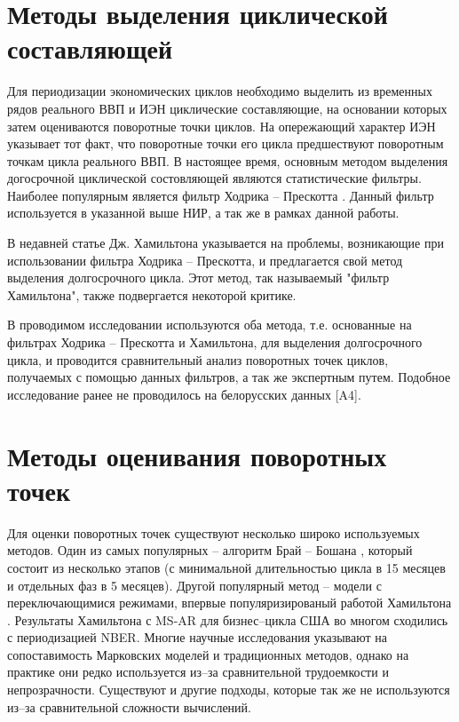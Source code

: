 \documentclass[a4paper,14pt]{extreport}
\begin{document}
	
	\section{Методы выделения циклической составляющей}
	
	Для периодизации экономических циклов необходимо выделить из временных рядов реального ВВП и ИЭН циклические составляющие, на основании которых затем оцениваются поворотные точки циклов. На опережающий характер ИЭН указывает тот факт, что поворотные точки его цикла предшествуют поворотным точкам цикла реального ВВП. В настоящее время, основным методом выделения догосрочной циклической состовляющей являются статистические фильтры. Наиболее популярным является фильтр Ходрика – Прескотта \cite{oecdCycleExtraction,estrellaFilterDo}. Данный фильтр используется в указанной выше НИР, а так же в рамках данной работы. 
	
	В недавней статье Дж. Хамильтона \cite{hamHP} указывается на проблемы, возникающие при использовании фильтра Ходрика – Прескотта, и предлагается свой метод выделения долгосрочного цикла. Этот метод, так называемый "фильтр Хамильтона", также подвергается некоторой критике.
	
	В проводимом исследовании используются оба метода, т.е. основанные на фильтрах Ходрика – Прескотта и Хамильтона, для выделения долгосрочного цикла, и проводится сравнительный анализ поворотных точек циклов, получаемых с помощью данных фильтров, а так же экспертным путем. Подобное исследование ранее не проводилось на белорусских данных [A4]. \iffalse \cite{makarevich_bsu_conf_2017}.\fi
	
	
	\section{Методы оценивания поворотных точек}
	
	Для оценки поворотных точек существуют несколько широко используемых методов. Один из самых популярных – алгоритм Брай – Бошана \cite{bryCyclicalAnalysis}, который состоит из несколько этапов (с минимальной длительностью цикла в 15 месяцев и отдельных фаз в 5 месяцев). Другой популярный метод – модели с переключающимися режимами, впервые популяризированый работой Хамильтона \cite{hamNewApproach}. Результаты Хамильтона с MS-AR для бизнес–цикла США во многом сходились с периодизацией NBER. Многие научные исследования \cite{bodmanCanada,brunoItaly,hardingTwoMethods} указывают на сопоставимость Марковских моделей и традиционных методов, однако на практике они редко используется из–за сравнительной трудоемкости и непрозрачности. Существуют и другие подходы, которые так же не используются из–за сравнительной сложности вычислений.
	
\end{document}
